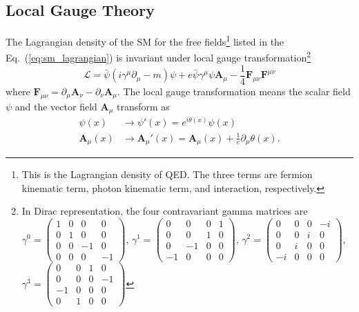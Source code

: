 \subsection{Local Gauge Theory}
\label{subsec:sm_gauge_theory}
The Lagrangian density of the SM for the free fields\footnote{This is the Lagrangian density of QED. The three terms are fermion kinematic term, photon kinematic term, and interaction, respectively.} listed in the Eq.~(\ref{eq:sm_lagrangian}) is invariant under local gauge transformation\footnote{In Dirac representation, the four contravariant gamma matrices are $\gamma^{0} = \left(\begin{matrix}1 & 0 & 0 & 0\\0 & 1 & 0 & 0\\0 & 0 & -1 & 0\\0 & 0 & 0 & -1\end{matrix}\right)$, $\gamma^{1} = \left(\begin{matrix}0 & 0 & 0 & 1\\0 & 0 & 1 & 0\\0 & -1 & 0 & 0\\-1 & 0 & 0 & 0\end{matrix}\right)$, $\gamma^{2} = \left(\begin{matrix}0 & 0 & 0 & -i\\0 & 0 & i & 0\\0 & i & 0 & 0\\-i & 0 & 0 & 0\end{matrix}\right)$, $\gamma^{3} = \left(\begin{matrix}0 & 0 & 1 & 0\\0 & 0 & 0 & -1\\-1 & 0 & 0 & 0\\0 & 1 & 0 & 0\end{matrix}\right)$}
%
\begin{equation}
    \mathcal{L} = \bar{\psi}(i\gamma^{\mu}\partial_{\mu} - m)\psi + e\bar{\psi}\gamma^{\mu}\psi\bm{A}_{\mu} - \frac{1}{4}\bm{F}_{\mu\nu}\bm{F}^{\mu\nu}
    \label{eq:sm_lagrangian}
\end{equation}
%
where $\bm{F}_{\mu\nu} = \partial_{\mu}\bm{A}_{\nu} - \partial_{\nu}\bm{A}_{\mu}$.
The local gauge transformation means the scalar field $\psi$ and the vector field $\bm{A}_{\mu}$ transform as
%
\begin{align}
    \psi(x) & \rightarrow \psi'(x) = e^{i\theta(x)}\psi(x)\\
    \bm{A}_{\mu}(x) & \rightarrow \bm{A}_{\mu}'(x) = \bm{A}_{\mu}(x) + \frac{1}{e}\partial_{\mu}\theta(x).
    \label{eq:sm_gauge_transformation}
\end{align}
